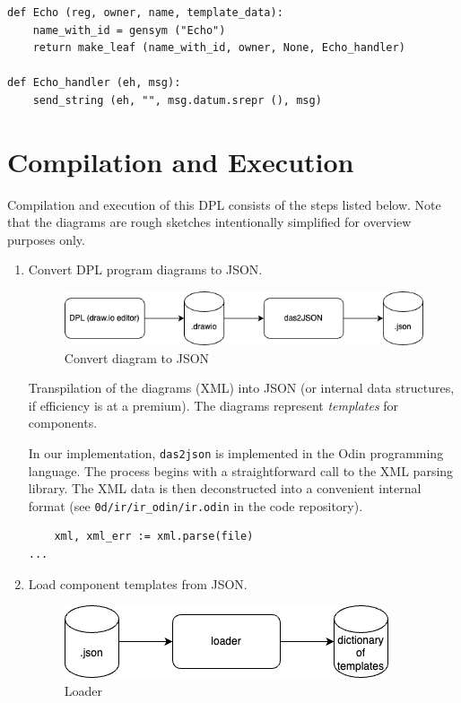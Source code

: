 \documentclass[10pt,anonymous,review]{acmart}
\begin{document}
\begin{verbatim}
def Echo (reg, owner, name, template_data):
    name_with_id = gensym ("Echo")
    return make_leaf (name_with_id, owner, None, Echo_handler)

def Echo_handler (eh, msg):
    send_string (eh, "", msg.datum.srepr (), msg)
\end{verbatim}

\section{Compilation and Execution}
Compilation and execution of this DPL consists of the steps listed below. Note that the diagrams are rough sketches intentionally simplified
for overview purposes only.

\begin{enumerate}
\item Convert DPL program diagrams to JSON.

  \begin{figure}[h]
    \centering
    \includegraphics[width=0.8\linewidth]{./media/image2.png}
    \caption{Convert diagram to JSON}
    \label{fig:convert_to_json}
  \end{figure}

  Transpilation of the diagrams (XML) into JSON (or internal data structures, if efficiency is at a premium). The diagrams represent \emph{templates} for components.
  
  In our implementation, \texttt{das2json} is implemented\cite{d2jrepo} in the Odin programming language. The process begins with a straightforward call to the XML parsing library. The XML data is then deconstructed into a convenient internal format (see \texttt{0d/ir/ir\_odin/ir.odin} in the code repository).

\begin{verbatim}
    xml, xml_err := xml.parse(file)
...
\end{verbatim}
  
\item Load component templates from JSON.

  \begin{figure}[h]
    \centering
    \includegraphics[width=0.6\linewidth]{./media/image3.png}
    \caption{Loader}
    \label{fig:load_templates}
  \end{figure}


\end{enumerate}
\end{document}
